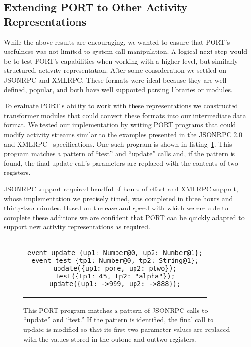 \subsection{Extending PORT to Other Activity Representations}

While the above results are encouraging, we wanted to ensure that PORT's
usefulness was not limited to system call manipulation.
A logical next step would be to test PORT's capabilities when working
with a higher level, but similarly structured, activity representation.
After some consideration we settled on JSONRPC and XMLRPC.  These formats
were ideal because they are well defined, popular, and both have well
supported parsing libraries or modules.

To evaluate PORT's ability to work with these representations we
constructed transformer modules that could convert these formats into our
intermediate data format.
We tested our implementation by writing PORT programs that could modify
activity streams similar to the examples presented in the JSONRPC
2.0~\cite{jsonspec} and XMLRPC~\cite{xmlspec}
specifications.  One such program is shown in
listing~\ref{lst:JSONProgram}.  This program matches a pattern of ``test''
and ``update'' calls and, if the pattern is found, the final update call's
parameters are replaced with the contents of two registers.

JSONRPC support required handful of hours of effort and XMLRPC
support, whose implementation we precisely timed, was completed in three
hours and thirty-two minutes.  Based on the ease and speed with which we
ere able to complete these additions we are confident that PORT can be
quickly adapted to support new activity representations as required.

\begin{figure}[H]
\centering
\begin{tabular}{c}
\begin{lstlisting}
event update {up1: Number@0, up2: Number@1};
event test {tp1: Number@0, tp2: String@1};
update({up1: pone, up2: ptwo});
test({tp1: 45, tp2: "alpha"});
update({up1: ->999, up2: ->888});
\end{lstlisting}
\end{tabular}
\caption{This PORT program matches a pattern of JSONRPC calls to
  ``update'' and ``test.''  If the pattern is identified, the final call to
  update is modified so that its first two parameter values are replaced
  with the values stored in the outone and outtwo registers.}
\label{lst:JSONProgram}
\end{figure}


